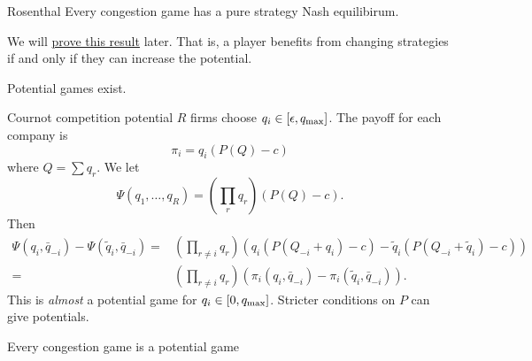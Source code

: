 \begin{atheorem}{Rosenthal}{}
    Every congestion game has a pure strategy Nash equilibirum.
\end{atheorem}
We will \hyperref[]{prove this result} later.
That is, a player benefits from changing strategies if and only if they can increase the potential.

Potential games exist.
\begin{aexample}{Cournot competition potential}{}
    $R$ firms choose $q_i\in[\epsilon,q_{\rm{max}}]$. The payoff for each company is \[
    \pi_i = q_i(P(Q)-c)
    \]
    where $Q=\sum q_r$.
    We let \[
        \Psi(q_1,\ldots, q_R) = \left(\prod_r q_r \right)(P(Q)-c).
    \]
    Then \begin{align*}
        \Psi(q_i,\bar{q}_{-i})-\Psi(\tilde{q}_i,\bar{q}_{-i})=&\left(\prod_{r\neq i}q_r\right)(q_i(P(Q_{-i}+q_i)-c)-\tilde{q}_i(P(Q_{-i}+\tilde{q}_i)-c))\\
        =&\left(\prod_{r\neq i}q_r\right)(\pi_i(q_i,\bar{q}_{-i})-\pi_i(\tilde{q}_i,\bar{q}_{-i})).
    \end{align*}
    This is \textit{almost} a potential game for $q_i\in[0,q_{\rm{max}}]$. Stricter conditions on $P$ can give potentials. 
\end{aexample} 

\begin{alemma}{}{}
    Every congestion game is a potential game
\end{alemma}

